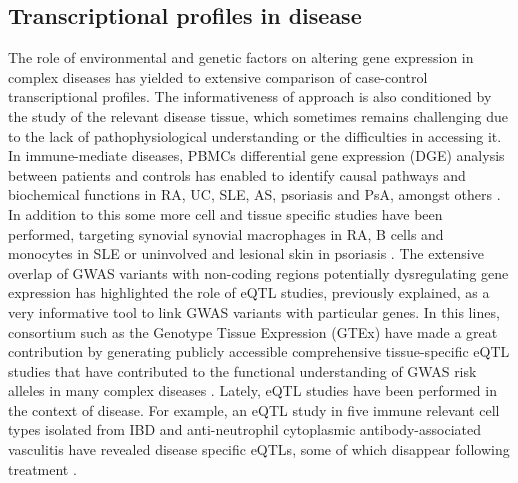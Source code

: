 \subsection{Transcriptional profiles in disease}
The role of environmental and genetic factors on altering gene expression in complex diseases has yielded to extensive comparison of case-control transcriptional profiles. The informativeness of approach is also conditioned by the study of the relevant disease tissue, which sometimes remains challenging due to the lack of pathophysiological understanding or the difficulties in accessing it. In immune-mediate diseases, PBMCs differential gene expression (DGE) analysis between patients and controls has enabled to identify causal pathways and biochemical functions in RA, UC, SLE, AS, psoriasis and PsA, amongst others \parencite{MIao2013,Junta2009,Baechler2003,Assassi2010,Batliwalla2005}. In addition to this some more cell and tissue specific studies have been performed, targeting synovial synovial macrophages in RA, B cells and monocytes in SLE or uninvolved and lesional skin in psoriasis \parencite{Katschke2001,Dozmorov2015,Jabbari2012}. The extensive overlap of GWAS variants with non-coding regions potentially dysregulating gene expression has highlighted the role of eQTL studies, previously explained, as a very informative tool to link GWAS variants with particular genes. In this lines, consortium such as the Genotype
Tissue Expression (GTEx) have made a great contribution by generating publicly accessible comprehensive tissue-specific eQTL studies that have contributed to the functional understanding of GWAS risk alleles in many complex diseases . Lately, eQTL studies have been performed in the context of disease. For example, an eQTL study in five immune relevant cell types isolated from IBD and anti-neutrophil cytoplasmic antibody-associated vasculitis have revealed disease specific eQTLs, some of which disappear following treatment \parencite{Peters2016}.


